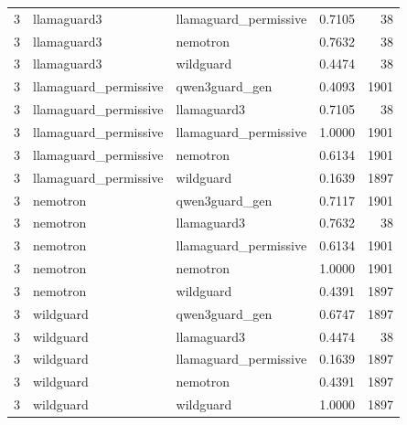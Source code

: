 \begin{tabular}{rllrr}
3 & llamaguard3 & llamaguard\_permissive & 0.7105 & 38 \\
3 & llamaguard3 & nemotron & 0.7632 & 38 \\
3 & llamaguard3 & wildguard & 0.4474 & 38 \\
3 & llamaguard\_permissive & qwen3guard\_gen & 0.4093 & 1901 \\
3 & llamaguard\_permissive & llamaguard3 & 0.7105 & 38 \\
3 & llamaguard\_permissive & llamaguard\_permissive & 1.0000 & 1901 \\
3 & llamaguard\_permissive & nemotron & 0.6134 & 1901 \\
3 & llamaguard\_permissive & wildguard & 0.1639 & 1897 \\
3 & nemotron & qwen3guard\_gen & 0.7117 & 1901 \\
3 & nemotron & llamaguard3 & 0.7632 & 38 \\
3 & nemotron & llamaguard\_permissive & 0.6134 & 1901 \\
3 & nemotron & nemotron & 1.0000 & 1901 \\
3 & nemotron & wildguard & 0.4391 & 1897 \\
3 & wildguard & qwen3guard\_gen & 0.6747 & 1897 \\
3 & wildguard & llamaguard3 & 0.4474 & 38 \\
3 & wildguard & llamaguard\_permissive & 0.1639 & 1897 \\
3 & wildguard & nemotron & 0.4391 & 1897 \\
3 & wildguard & wildguard & 1.0000 & 1897 \\
\bottomrule
\end{tabular}
